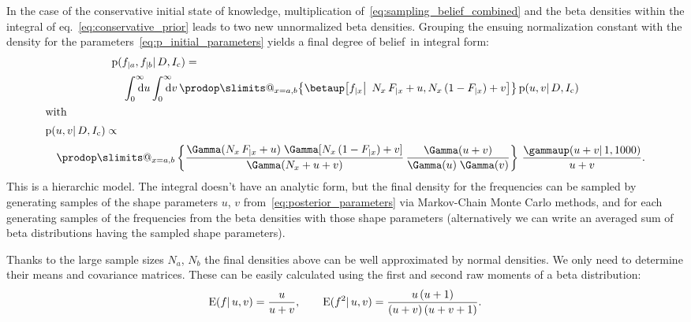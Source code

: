 \documentclass[\ifafour a4paper,12pt,\else a5paper,10pt,\fi%
onecolumn,oneside,article,%
british%
]{memoir}
\makeatletter
\theoremstyle{remark}
\theoremstyle{innote}
\def\prod{\DOTSI\prodop\slimits@}
\newcommand*{\di}{\mathrm{d}}%
\newcommand*{\pf}{\mathrm{p}}%
\renewcommand*{\|}{\mathpunct{|}}
\newcommand*{\bigcond}{\mathpunct{\big|\ }}%
\newcommand*{\eqn}{eq.}%
\newcommand*{\E}{\mathrm{E}}
\DeclarePairedDelimiter\expp{(}{)}
\newcommand*{\expe}{\E\expp}%
\newcommand*{\dob}{degree of belief}
\newcommand*{\yD}{D}
\newcommand*{\yI}{I}
\newcommand*{\yIc}{\yI_\text{c}}
\newcommand*{\ya}{a}
\newcommand*{\yb}{b}
\newcommand*{\dbeta}{\betaup}
\newcommand*{\dgamma}{\gammaup}
\newcommand*{\yua}{u}
\newcommand*{\yub}{v}
\makeatother
\begin{document}
In the case of the conservative initial state of knowledge, multiplication
of~\eqref{eq:sampling_belief_combined} and the beta densities within the
integral of \eqn~\eqref{eq:conservative_prior} leads to two new
unnormalized beta densities. Grouping the ensuing normalization constant
with the density for the parameters~\eqref{eq:p_initial_parameters} yields
a final \dob\ in integral form:
\begin{subequations}
  \label{eq:final_from_conservative}
  \begin{gather}
  \begin{multlined}[t][\linewidth]
    \pf(f_{|\ya}, f_{|\yb} \| \yD, \yIc)
    ={}\\[\jot]
    \int_{\mathrlap{0}}^{\mathrlap{\infty}}\di\yua
    \int_{\mathrlap{0}}^{\mathrlap{\infty}}\di\yub\,
    \prod_{x=\ya,\yb}\bigl\{ 
    \dbeta\bigl[f_{|x} \bigcond N_{x}\,F_{|x} +\yua, N_{x}\,(1-F_{|x})+\yub\bigr]
    \bigr\}\, \pf(\yua,\yub \| \yD,\yIc)
  \end{multlined}\\
  \shortintertext{with}
      \label{eq:posterior_parameters}
  \begin{multlined}[t][\linewidth]
    \pf(\yua,\yub \| \yD,\yIc) \propto{}\\[\jot]
    \prod_{x=\ya,\yb}\left\{
      \frac{\Gamma(N_{x}\,F_{|x}+\yua)\;\Gamma[N_{x}\,(1-F_{|x})+\yub]}
      {\Gamma(N_{x}+\yua+\yub)}\,
      \frac{\Gamma(\yua+\yub)}
      {\Gamma(\yua)\;\Gamma(\yub)} \right\}
    \,\frac{\dgamma(\yua+\yub \| 1, 1000)}{\yua+\yub}.
  \end{multlined}
\end{gather}
\end{subequations}
This is a hierarchic model. The integral doesn't have an analytic form, but
the final density for the frequencies can be sampled by generating samples
of the shape parameters $\yua$, $\yub$ from~\eqref{eq:posterior_parameters}
via Markov-Chain Monte Carlo methods, and for each generating samples of
the frequencies from the beta densities with those shape parameters
(alternatively we can write an averaged sum of beta distributions having the
sampled shape parameters).

\medskip

Thanks to the large sample sizes $N_{\ya}$, $N_{\yb}$ the final densities
above can be well approximated by normal densities. We only need to
determine their means and covariance matrices. These can be easily
calculated using the first and second raw moments of a beta distribution:
\begin{equation}
  \label{eq:moments_beta}
  \expe{f \| \yua,\yub} = \frac{\yua}{\yua+\yub},
  \qquad
  \expe{f^2 \| \yua,\yub} = \frac{\yua\,(\yua+1)}{(\yua+\yub)\,(\yua+\yub+1)}.  
\end{equation}
\end{document}
